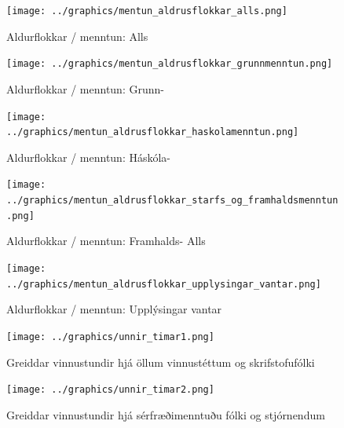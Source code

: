 \documentclass[12pt, git, draft]{rureport}
\begin{document}

\begin{figure}
	\centering 
	\texttt{[image: ../graphics/mentun\_aldrusflokkar\_alls.png]}
	\caption{Aldurflokkar / menntun: Alls \label{fig:menntunall}}
\end{figure}

\begin{figure}
	\centering 
	\texttt{[image: ../graphics/mentun\_aldrusflokkar\_grunnmenntun.png]}
	\caption{Aldurflokkar / menntun: Grunn- \label{fig:menntungrunn}}
\end{figure}

\begin{figure}
	\centering 
	\texttt{[image: ../graphics/mentun\_aldrusflokkar\_haskolamenntun.png]}
	\caption{Aldurflokkar / menntun: Háskóla- \label{fig:menntunhs}}
\end{figure}

\begin{figure}
	\centering 
	\texttt{[image: ../graphics/mentun\_aldrusflokkar\_starfs\_og\_framhaldsmenntun.png]}
	\caption{Aldurflokkar / menntun: Framhalds- Alls \label{fig:menntunfram}}
\end{figure}

\begin{figure}
	\centering 
	\texttt{[image: ../graphics/mentun\_aldrusflokkar\_upplysingar\_vantar.png]}
	\caption{Aldurflokkar / menntun: Upplýsingar vantar \label{fig:menntunvantar}}
\end{figure}

\begin{figure}
	\centering 
	\texttt{[image: ../graphics/unnir\_timar1.png]}
	\caption{Greiddar vinnustundir hjá öllum vinnustéttum og skrifstofufólki \label{fig:unnirtimar1}}
\end{figure}

\begin{figure}
	\centering 
	\texttt{[image: ../graphics/unnir\_timar2.png]}
	\caption{Greiddar vinnustundir hjá sérfræðimenntuðu fólki og stjórnendum \label{fig:unnirtimar2}}
\end{figure}

%
\clearpage
\printbibliography
\end{document}
